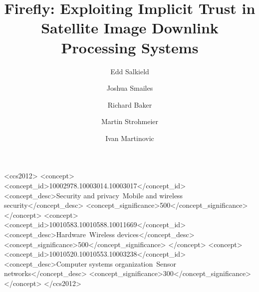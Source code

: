 \documentclass[sigconf,anonymous,review]{acmart}
\title{Firefly: Exploiting Implicit Trust in Satellite Image Downlink Processing Systems}
\begin{document}
\author{Edd Salkield}

\author{Joshua Smailes}

\author{Richard Baker}

\author{Martin Strohmeier}

\author{Ivan Martinovic}



\begin{CCSXML}
  <ccs2012>
  <concept>
  <concept_id>10002978.10003014.10003017</concept_id>
  <concept_desc>Security and privacy~Mobile and wireless security</concept_desc>
  <concept_significance>500</concept_significance>
  </concept>
  <concept>
  <concept_id>10010583.10010588.10011669</concept_id>
  <concept_desc>Hardware~Wireless devices</concept_desc>
  <concept_significance>500</concept_significance>
  </concept>
  <concept>
  <concept_id>10010520.10010553.10003238</concept_id>
  <concept_desc>Computer systems organization~Sensor networks</concept_desc>
  <concept_significance>300</concept_significance>
  </concept>
  </ccs2012>
\end{CCSXML}



\maketitle












\end{document}
